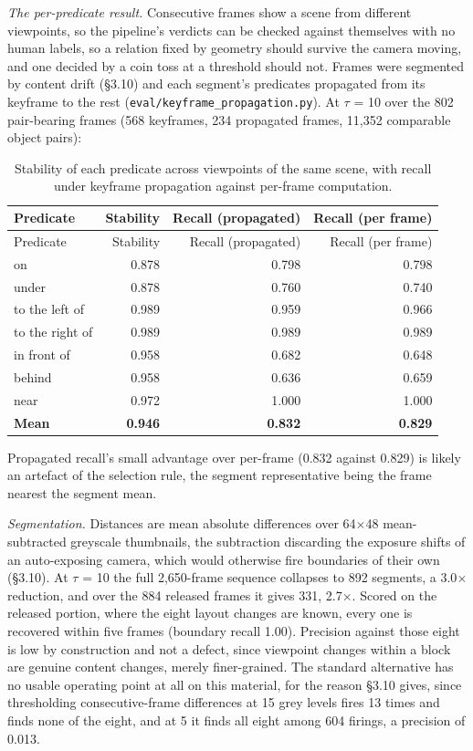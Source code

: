 \textit{The per-predicate result.} Consecutive frames show a scene from different viewpoints, so the pipeline's verdicts can be checked against themselves with no human labels, so a relation fixed by geometry should survive the camera moving, and one decided by a coin toss at a threshold should not. Frames were segmented by content drift (\S{}3.10) and each segment's predicates propagated from its keyframe to the rest (\texttt{eval/keyframe\_\allowbreak{}propagation.py}). At $\tau$ = 10 over the 802 pair-bearing frames (568 keyframes, 234 propagated frames, 11,352 comparable object pairs):

\begin{center}
\setlength{\tabcolsep}{6pt}
\small
\begin{longtable}{lrrr}
\caption[Stability of each predicate across viewpoints]{Stability of each predicate across viewpoints of the same scene, with recall under keyframe propagation against per-frame computation.}\\
\hline
Predicate & Stability & Recall (propagated) & Recall (per frame) \\
\hline
\endfirsthead
\hline
Predicate & Stability & Recall (propagated) & Recall (per frame) \\
\hline
\endhead
on & 0.878 & 0.798 & 0.798 \\
under & 0.878 & 0.760 & 0.740 \\
to the left of & 0.989 & 0.959 & 0.966 \\
to the right of & 0.989 & 0.989 & 0.989 \\
in front of & 0.958 & 0.682 & 0.648 \\
behind & 0.958 & 0.636 & 0.659 \\
near & 0.972 & 1.000 & 1.000 \\
\textbf{Mean} & \textbf{0.946} & \textbf{0.832} & \textbf{0.829} \\
\hline
\end{longtable}
\end{center}

Propagated recall's small advantage over per-frame (0.832 against 0.829) is likely an artefact of the selection rule, the segment representative being the frame nearest the segment mean.

\textit{Segmentation.} Distances are mean absolute differences over 64$\times$48 mean-subtracted greyscale thumbnails, the subtraction discarding the exposure shifts of an auto-exposing camera, which would otherwise fire boundaries of their own (\S{}3.10). At $\tau$ = 10 the full 2,650-frame sequence collapses to 892 segments, a 3.0$\times$ reduction, and over the 884 released frames it gives 331, 2.7$\times$. Scored on the released portion, where the eight layout changes are known, every one is recovered within five frames (boundary recall 1.00). Precision against those eight is low by construction and not a defect, since viewpoint changes within a block are genuine content changes, merely finer-grained. The standard alternative has no usable operating point at all on this material, for the reason \S{}3.10 gives, since thresholding consecutive-frame differences at 15 grey levels fires 13 times and finds none of the eight, and at 5 it finds all eight among 604 firings, a precision of 0.013.


